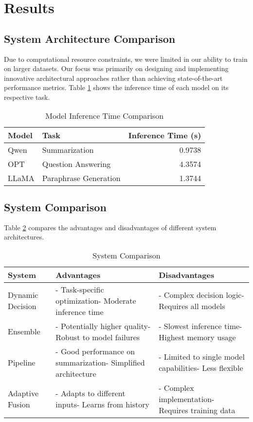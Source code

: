 \documentclass[10pt,twocolumn,letterpaper]{article}
\begin{document}
\section{Results}

\subsection{System Architecture Comparison}
Due to computational resource constraints, we were limited in our ability to train on larger datasets. Our focus was primarily on designing and implementing innovative architectural approaches rather than achieving state-of-the-art performance metrics. Table \ref{tab:task_performance} shows the inference time of each model on its respective task.

\begin{table}[htbp]
\centering
\caption{Model Inference Time Comparison}
\label{tab:task_performance}
\begin{tabular}{@{}llr@{}}
\toprule
Model & Task & Inference Time (s) \\
\midrule
Qwen & Summarization & 0.9738 \\
OPT & Question Answering & 4.3574 \\
LLaMA & Paraphrase Generation & 1.3744 \\
\bottomrule
\end{tabular}
\end{table}

\subsection{System Comparison}
Table \ref{tab:system_comparison} compares the advantages and disadvantages of different system architectures.

\begin{table}[htbp]
\centering
\caption{System Comparison}
\label{tab:system_comparison}
\begin{tabularx}{\columnwidth}{@{}lXX@{}} 
\toprule
System & Advantages & Disadvantages \\
\midrule
Dynamic Decision & - Task-specific optimization\newline - Moderate inference time & - Complex decision logic\newline - Requires all models \\
\midrule
Ensemble & - Potentially higher quality\newline - Robust to model failures & - Slowest inference time\newline - Highest memory usage \\
\midrule
Pipeline & - Good performance on summarization\newline - Simplified architecture & - Limited to single model capabilities\newline - Less flexible \\
\midrule
Adaptive Fusion & - Adapts to different inputs\newline - Learns from history & - Complex implementation\newline - Requires training data \\
\bottomrule
\end{tabularx}
\end{table}
\end{document}
